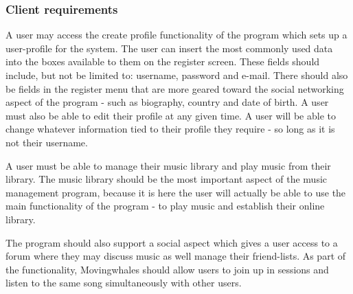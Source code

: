 \subsubsection{Client requirements}
A user may access the create profile functionality of the program which sets up a user-profile for the system. The user can insert the most commonly used data into the boxes available to them on the register screen. These fields should include, but not be limited to: username, password and e-mail. There should also be fields in the register menu that are more geared toward the social networking aspect of the program - such as biography, country and date of birth. 
A user must also be able to edit their profile at any given time. A user will be able to change whatever information tied to their profile they require - so long as it is not their username. 

A user must be able to manage their music library and play music from their library. The music library should be the most important aspect of the music management program, because it is here the user will actually be able to use the main functionality of the program - to play music and establish their online library.

The program should also support a social aspect which gives a user access to a forum where they may discuss music as well manage their friend-lists. As part of the functionality, Movingwhales should allow users to join up in sessions and listen to the same song simultaneously with other users.